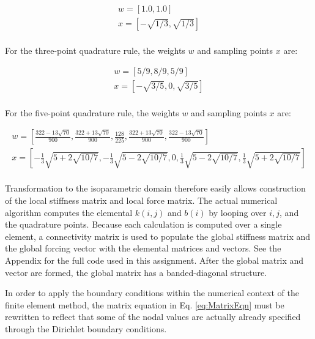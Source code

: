 \documentclass[10pt]{article}
\begin{document}
\begin{equation}
\begin{aligned}
w=[1.0, 1.0]\\
x=[-\sqrt{1/3}, \sqrt{1/3}]\\
\end{aligned}
\end{equation} 

For the three-point quadrature rule, the weights \(w\) and sampling points \(x\) are:

\begin{equation}
\begin{aligned}
w=[5/9, 8/9, 5/9]\\
x=[-\sqrt{3/5}, 0, \sqrt{3/5}]\\
\end{aligned}
\end{equation} 

For the five-point quadrature rule, the weights \(w\) and sampling points \(x\) are:

\begin{equation}
\begin{aligned}
w=\left\lbrack\frac{322-13\sqrt{70}}{900}, \frac{322+13\sqrt{70}}{900}, \frac{128}{225}, \frac{322+13\sqrt{70}}{900}, \frac{322-13\sqrt{70}}{900}\right\rbrack\\
x=\left\lbrack-\frac{1}{3}\sqrt{5+2\sqrt{10/7}}, -\frac{1}{3}\sqrt{5-2\sqrt{10/7}}, 0, \frac{1}{3}\sqrt{5-2\sqrt{10/7}}, \frac{1}{3}\sqrt{5+2\sqrt{10/7}}\right\rbrack\\
\end{aligned}
\end{equation} 

Transformation to the isoparametric domain therefore easily allows construction of the local stiffness matrix and local force matrix. The actual numerical algorithm computes the elemental \(k(i,j)\) and \(b(i)\) by looping over \(i, j\), and the quadrature points. Because each calculation is computed over a single element, a connectivity matrix is used to populate the global stiffness matrix and the global forcing vector with the elemental matrices and vectors. See the Appendix for the full code used in this assignment. After the global matrix and vector are formed, the global matrix has a banded-diagonal structure. 

In order to apply the boundary conditions within the numerical context of the finite element method, the matrix equation in Eq. \eqref{eq:MatrixEqn} must be rewritten to reflect that some of the nodal values are actually already specified through the Dirichlet boundary conditions. 
\end{document}
